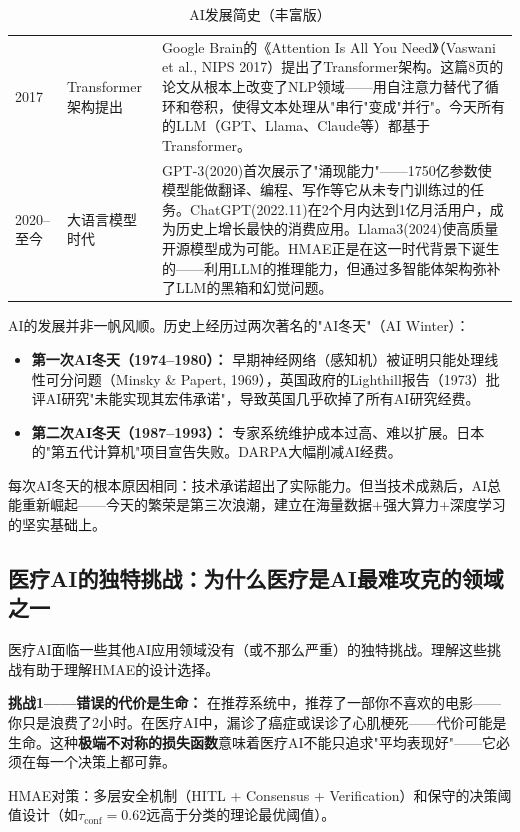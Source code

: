 \documentclass[11pt,a4paper]{ctexart}
\begin{document}
\begin{table}[H]
\begin{tabular}{p{0.9cm}p{2.8cm}p{10.8cm}}
2017 & Transformer架构提出 & Google Brain的《Attention Is All You Need》（Vaswani et al., NIPS 2017）提出了Transformer架构。这篇8页的论文从根本上改变了NLP领域——用自注意力替代了循环和卷积，使得文本处理从"串行"变成"并行"。今天所有的LLM（GPT、Llama、Claude等）都基于Transformer。 \\
2020--至今 & 大语言模型时代 & GPT-3(2020)首次展示了"涌现能力"——1750亿参数使模型能做翻译、编程、写作等它从未专门训练过的任务。ChatGPT(2022.11)在2个月内达到1亿月活用户，成为历史上增长最快的消费应用。Llama3(2024)使高质量开源模型成为可能。HMAE正是在这一时代背景下诞生的——利用LLM的推理能力，但通过多智能体架构弥补了LLM的黑箱和幻觉问题。 \\
\bottomrule
\end{tabular}
\caption{AI发展简史（丰富版）}
\end{table}

\begin{deepbox}
AI的发展并非一帆风顺。历史上经历过两次著名的"AI冬天"（AI Winter）：
\begin{itemize}[nosep]
\item \textbf{第一次AI冬天（1974--1980）：} 早期神经网络（感知机）被证明只能处理线性可分问题（Minsky \& Papert, 1969），英国政府的Lighthill报告（1973）批评AI研究"未能实现其宏伟承诺"，导致英国几乎砍掉了所有AI研究经费。
\item \textbf{第二次AI冬天（1987--1993）：} 专家系统维护成本过高、难以扩展。日本的"第五代计算机"项目宣告失败。DARPA大幅削减AI经费。
\end{itemize}
每次AI冬天的根本原因相同：技术承诺超出了实际能力。但当技术成熟后，AI总能重新崛起——今天的繁荣是第三次浪潮，建立在海量数据+强大算力+深度学习的坚实基础上。
\end{deepbox}


\subsection{医疗AI的独特挑战：为什么医疗是AI最难攻克的领域之一}

医疗AI面临一些其他AI应用领域没有（或不那么严重）的独特挑战。理解这些挑战有助于理解HMAE的设计选择。

\textbf{挑战1——错误的代价是生命：}
在推荐系统中，推荐了一部你不喜欢的电影——你只是浪费了2小时。在医疗AI中，漏诊了癌症或误诊了心肌梗死——代价可能是生命。这种\textbf{极端不对称的损失函数}意味着医疗AI不能只追求"平均表现好"——它必须在每一个决策上都可靠。

HMAE对策：多层安全机制（HITL + Consensus + Verification）和保守的决策阈值设计（如$\tau_{\text{conf}}=0.62$远高于分类的理论最优阈值）。
\end{document}
